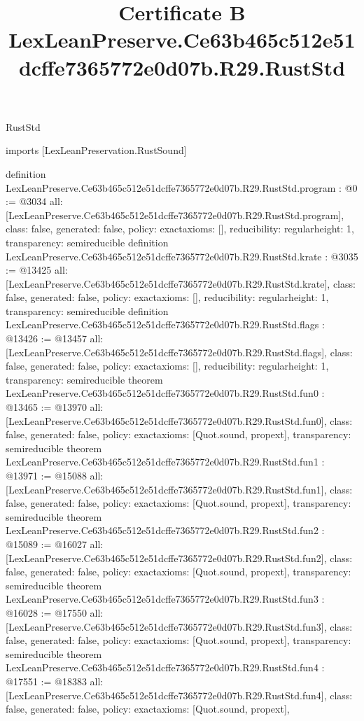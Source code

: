 \begin{lexlean}{RustStd}
\title{Certificate B LexLeanPreserve.Ce63b465c512e51dcffe7365772e0d07b.R29.RustStd}
\begin{coremodule}
imports [LexLeanPreservation.RustSound]

definition LexLeanPreserve.Ce63b465c512e51dcffe7365772e0d07b.R29.RustStd.program : @0 := @3034 {
  all: [LexLeanPreserve.Ce63b465c512e51dcffe7365772e0d07b.R29.RustStd.program],
  class: false,
  generated: false,
  policy: exact{axioms: []},
  reducibility: regular{height: 1},
  transparency: semireducible
}
definition LexLeanPreserve.Ce63b465c512e51dcffe7365772e0d07b.R29.RustStd.krate : @3035 := @13425 {
  all: [LexLeanPreserve.Ce63b465c512e51dcffe7365772e0d07b.R29.RustStd.krate],
  class: false,
  generated: false,
  policy: exact{axioms: []},
  reducibility: regular{height: 1},
  transparency: semireducible
}
definition LexLeanPreserve.Ce63b465c512e51dcffe7365772e0d07b.R29.RustStd.flags : @13426 := @13457 {
  all: [LexLeanPreserve.Ce63b465c512e51dcffe7365772e0d07b.R29.RustStd.flags],
  class: false,
  generated: false,
  policy: exact{axioms: []},
  reducibility: regular{height: 1},
  transparency: semireducible
}
theorem LexLeanPreserve.Ce63b465c512e51dcffe7365772e0d07b.R29.RustStd.fun0 : @13465 := @13970 {
  all: [LexLeanPreserve.Ce63b465c512e51dcffe7365772e0d07b.R29.RustStd.fun0],
  class: false,
  generated: false,
  policy: exact{axioms: [Quot.sound, propext]},
  transparency: semireducible
}
theorem LexLeanPreserve.Ce63b465c512e51dcffe7365772e0d07b.R29.RustStd.fun1 : @13971 := @15088 {
  all: [LexLeanPreserve.Ce63b465c512e51dcffe7365772e0d07b.R29.RustStd.fun1],
  class: false,
  generated: false,
  policy: exact{axioms: [Quot.sound, propext]},
  transparency: semireducible
}
theorem LexLeanPreserve.Ce63b465c512e51dcffe7365772e0d07b.R29.RustStd.fun2 : @15089 := @16027 {
  all: [LexLeanPreserve.Ce63b465c512e51dcffe7365772e0d07b.R29.RustStd.fun2],
  class: false,
  generated: false,
  policy: exact{axioms: [Quot.sound, propext]},
  transparency: semireducible
}
theorem LexLeanPreserve.Ce63b465c512e51dcffe7365772e0d07b.R29.RustStd.fun3 : @16028 := @17550 {
  all: [LexLeanPreserve.Ce63b465c512e51dcffe7365772e0d07b.R29.RustStd.fun3],
  class: false,
  generated: false,
  policy: exact{axioms: [Quot.sound, propext]},
  transparency: semireducible
}
theorem LexLeanPreserve.Ce63b465c512e51dcffe7365772e0d07b.R29.RustStd.fun4 : @17551 := @18383 {
  all: [LexLeanPreserve.Ce63b465c512e51dcffe7365772e0d07b.R29.RustStd.fun4],
  class: false,
  generated: false,
  policy: exact{axioms: [Quot.sound, propext]},
}
\end{coremodule}
\end{lexlean}
